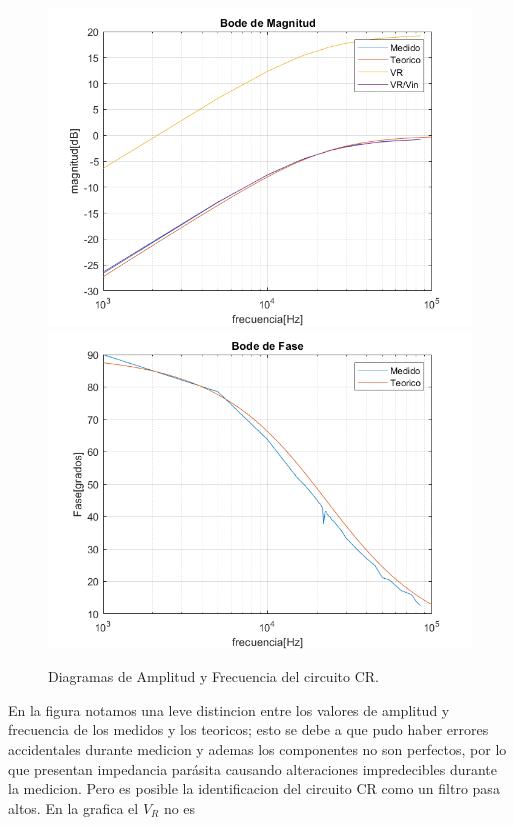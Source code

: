 \begin{figure}[h!]
\centering
\includegraphics[scale=0.5]{2Compmag.png}
\includegraphics[scale=0.5]{2Compfase.png}
\caption{Diagramas de Amplitud y Frecuencia del circuito CR.}
\label{fig:CR}
\end{figure}

En la figura notamos una leve distincion entre los valores de amplitud y frecuencia de los medidos y los teoricos; esto se debe a que pudo haber errores accidentales durante medicion y ademas los componentes no son perfectos, por lo que presentan impedancia parásita causando alteraciones impredecibles durante la medicion. Pero es posible la identificacion del circuito CR como un filtro pasa altos.
En la grafica el $V_R$ no es  




